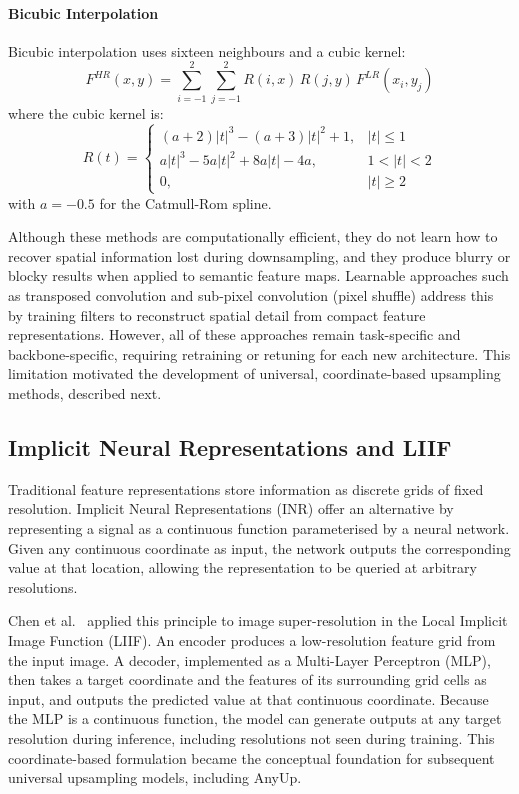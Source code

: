 \paragraph{Bicubic Interpolation}
Bicubic interpolation uses sixteen neighbours and a cubic
kernel:
\begin{equation}
  F^{HR}(x, y)
  = \sum_{i=-1}^{2} \sum_{j=-1}^{2}
    R(i, x)\, R(j, y)\, F^{LR}(x_i, y_j)
\end{equation}
where the cubic kernel is:
\begin{equation}
  R(t) =
  \begin{cases}
    (a+2)|t|^3 - (a+3)|t|^2 + 1, & |t| \le 1 \\
    a|t|^3 - 5a|t|^2 + 8a|t| - 4a, & 1 < |t| < 2 \\
    0, & |t| \ge 2
  \end{cases}
\end{equation}
with $a = -0.5$ for the Catmull-Rom spline.

Although these methods are computationally efficient, they do
not learn how to recover spatial information lost during
downsampling, and they produce blurry or blocky results when
applied to semantic feature maps.
Learnable approaches such as transposed convolution and
sub-pixel convolution (pixel shuffle) address this by training
filters to reconstruct spatial detail from compact feature
representations.
However, all of these approaches remain task-specific and
backbone-specific, requiring retraining or retuning for each new
architecture.
This limitation motivated the development of universal,
coordinate-based upsampling methods, described next.

\subsection{Implicit Neural Representations and LIIF}

Traditional feature representations store information as
discrete grids of fixed resolution.
Implicit Neural Representations (INR) offer an alternative by
representing a signal as a continuous function parameterised by
a neural network.
Given any continuous coordinate as input, the network outputs
the corresponding value at that location, allowing the
representation to be queried at arbitrary resolutions.

Chen et al.~\cite{liif} applied this principle to image
super-resolution in the Local Implicit Image Function (LIIF).
An encoder produces a low-resolution feature grid from the
input image.
A decoder, implemented as a Multi-Layer Perceptron (MLP), 
then takes a target coordinate and the features of its
surrounding grid cells as input, and outputs the predicted value
at that continuous coordinate.
Because the MLP is a continuous function, the model can
generate outputs at any target resolution during inference,
including resolutions not seen during training.
This coordinate-based formulation became the conceptual
foundation for subsequent universal upsampling models,
including AnyUp.

